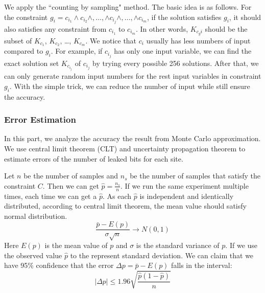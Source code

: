We apply the ``counting by sampling" method. The basic idea is as follows.
For the constraint $g_{i}= c_{i_1} \land c_{i_2} \land ,\ldots, \land c_{i_j} \land ,\ldots, 
\land c_{i_m}$, 
if the solution satisfies $g_{i}$, it should also
satisfies any constraint from $c_{i_1}$ to $c_{i_m}$. In other words,
$K_{c_gi}$ should be the subset of $K_{c_1}$, $K_{c_2}$, \ldots , $K_{c_m}$.
We notice that $c_i$ usually has less numbers of input compared to $g_{i}$.
For example, if $c_{i_j}$ has only one input variable, we can find the exact
solution set $K_{c_{i_j}}$ of $c_{i_j}$ by trying every possible 256 solutions. After that,
we can only generate random input numbers for the rest input variables in 
constraint $g_{i}$. With the simple trick, we can reduce the number of input while
still ensure the accuracy.




\subsubsection{Error Estimation}
In this part, we analyze the accuracy the result from Monte Carlo approximation. 
We use central limit theorem (CLT) and uncertainty propagation theorem
to estimate errors of the number of leaked bits for each site.

Let $n$ be the number of samples and $n_s$ be the number of samples
that satisfy the constraint $C$. Then we can get $\hat{p} = \frac{n_s}{n}$.
If we run the same experiment multiple times, each time we can
get a $\hat{p}$. 
As each $\hat{p}$ is independent and identically distributed, according to 
central limit theorem, the mean value should 
satisfy normal distribution.
$$ \frac{\bar{p}-E(p)}{\sigma\sqrt{n}} \rightarrow N(0,1) $$
Here $E(p)$ is the mean value of $p$ and $\sigma$ is the standard 
variance of $p$. If we use the observed value $\hat{p}$ 
to the represent standard deviation.
We can claim that we have 95\% confidence that the error 
$\Delta p= \bar{p} - E(p)$ falls in the interval:
$$ |\Delta p| \leq 1.96\sqrt{\frac{ \hat{p} (1- \hat{p} )}{n}}$$


